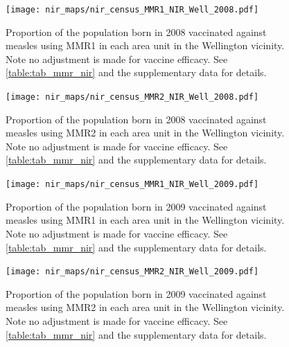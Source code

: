 \documentclass{article}
\begin{document}
% 
\begin{figure}
\begin{center}
    \texttt{[image: nir\_maps/nir\_census\_MMR1\_NIR\_Well\_2008.pdf]}
\end{center}
    \caption{Proportion of the population born in 2008 vaccinated against measles using MMR1 in each area unit in the Wellington vicinity. Note no adjustment is made for vaccine efficacy. See \autoref{table:tab_mmr_nir} and the supplementary data for details.}
\label{fig:fig12008_w}
\end{figure}
% 
% 
\begin{figure}
\begin{center}
    \texttt{[image: nir\_maps/nir\_census\_MMR2\_NIR\_Well\_2008.pdf]}
 \end{center}
    \caption{Proportion of the population born in 2008 vaccinated against measles using MMR2 in each area unit in the Wellington vicinity. Note no adjustment is made for vaccine efficacy. See \autoref{table:tab_mmr_nir} and the supplementary data for details.}
\label{fig:fig22008_w}
\end{figure}


\begin{figure}
\begin{center}
    \texttt{[image: nir\_maps/nir\_census\_MMR1\_NIR\_Well\_2009.pdf]}
 \end{center}
    \caption{Proportion of the population born in 2009 vaccinated against measles using MMR1 in each area unit in the Wellington vicinity. Note no adjustment is made for vaccine efficacy. See \autoref{table:tab_mmr_nir} and the supplementary data for details.}
\label{fig:fig12009_w}
\end{figure}


\begin{figure}
\begin{center}
    \texttt{[image: nir\_maps/nir\_census\_MMR2\_NIR\_Well\_2009.pdf]}
 \end{center}
    \caption{Proportion of the population born in 2009 vaccinated against measles using MMR2 in each area unit in the Wellington vicinity. Note no adjustment is made for vaccine efficacy. See \autoref{table:tab_mmr_nir} and the supplementary data for details.}
\label{fig:fig22009_w}
\end{figure}
\end{document}
